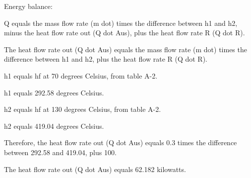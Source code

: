Energy balance:

Q equals the mass flow rate (m dot) times the difference between h1 and h2, minus the heat flow rate out (Q dot Aus), plus the heat flow rate R (Q dot R).

The heat flow rate out (Q dot Aus) equals the mass flow rate (m dot) times the difference between h1 and h2, plus the heat flow rate R (Q dot R).

h1 equals hf at 70 degrees Celsius, from table A-2.

h1 equals 292.58 degrees Celsius.

h2 equals hf at 130 degrees Celsius, from table A-2.

h2 equals 419.04 degrees Celsius.

Therefore, the heat flow rate out (Q dot Aus) equals 0.3 times the difference between 292.58 and 419.04, plus 100.

The heat flow rate out (Q dot Aus) equals 62.182 kilowatts.